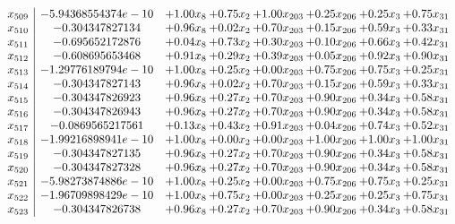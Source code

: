 \documentclass[8pt]{article}
\begin{document}
\[\begin{array}{c| c c@{\hskip 2pt} c@{\hskip 2pt} c@{\hskip 2pt} c@{\hskip 2pt} c@{\hskip 2pt} c@{\hskip 2pt} }
 x_{509}   &  -5.94368554374e-10 & +  1.00 x_{8} & +  0.75 x_{2} & +  1.00 x_{203} & +  0.25 x_{206} & +  0.25 x_{3} & +  0.75 x_{31}\\
 x_{510}   &  -0.304347827134 & +  0.96 x_{8} & +  0.02 x_{2} & +  0.70 x_{203} & +  0.15 x_{206} & +  0.59 x_{3} & +  0.33 x_{31}\\
 x_{511}   &  -0.695652172876 & +  0.04 x_{8} & +  0.73 x_{2} & +  0.30 x_{203} & +  0.10 x_{206} & +  0.66 x_{3} & +  0.42 x_{31}\\
 x_{512}   &  -0.608695653468 & +  0.91 x_{8} & +  0.29 x_{2} & +  0.39 x_{203} & +  0.05 x_{206} & +  0.92 x_{3} & +  0.90 x_{31}\\
 x_{513}   &  -1.29776189794e-10 & +  1.00 x_{8} & +  0.25 x_{2} & +  0.00 x_{203} & +  0.75 x_{206} & +  0.75 x_{3} & +  0.25 x_{31}\\
 x_{514}   &  -0.304347827143 & +  0.96 x_{8} & +  0.02 x_{2} & +  0.70 x_{203} & +  0.15 x_{206} & +  0.59 x_{3} & +  0.33 x_{31}\\
 x_{515}   &  -0.304347826923 & +  0.96 x_{8} & +  0.27 x_{2} & +  0.70 x_{203} & +  0.90 x_{206} & +  0.34 x_{3} & +  0.58 x_{31}\\
 x_{516}   &  -0.304347826943 & +  0.96 x_{8} & +  0.27 x_{2} & +  0.70 x_{203} & +  0.90 x_{206} & +  0.34 x_{3} & +  0.58 x_{31}\\
 x_{517}   &  -0.0869565217561 & +  0.13 x_{8} & +  0.43 x_{2} & +  0.91 x_{203} & +  0.04 x_{206} & +  0.74 x_{3} & +  0.52 x_{31}\\
 x_{518}   &  -1.99216898941e-10 & +  1.00 x_{8} & +  0.00 x_{2} & +  0.00 x_{203} & +  1.00 x_{206} & +  1.00 x_{3} & +  1.00 x_{31}\\
 x_{519}   &  -0.304347827135 & +  0.96 x_{8} & +  0.27 x_{2} & +  0.70 x_{203} & +  0.90 x_{206} & +  0.34 x_{3} & +  0.58 x_{31}\\
 x_{520}   &  -0.304347827328 & +  0.96 x_{8} & +  0.27 x_{2} & +  0.70 x_{203} & +  0.90 x_{206} & +  0.34 x_{3} & +  0.58 x_{31}\\
 x_{521}   &  -5.98273874886e-10 & +  1.00 x_{8} & +  0.25 x_{2} & +  0.00 x_{203} & +  0.75 x_{206} & +  0.75 x_{3} & +  0.25 x_{31}\\
 x_{522}   &  -1.96709898429e-10 & +  1.00 x_{8} & +  0.75 x_{2} & +  0.00 x_{203} & +  0.25 x_{206} & +  0.25 x_{3} & +  0.75 x_{31}\\
 x_{523}   &  -0.304347826738 & +  0.96 x_{8} & +  0.27 x_{2} & +  0.70 x_{203} & +  0.90 x_{206} & +  0.34 x_{3} & +  0.58 x_{31}\\

\end{array}\]
\end{document}
